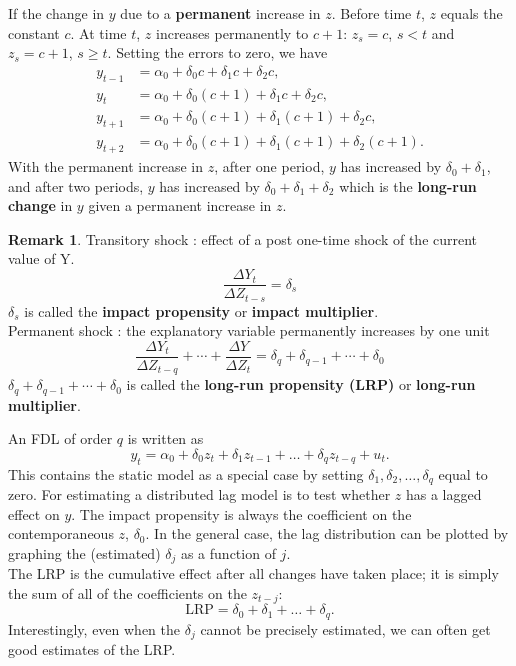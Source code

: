 \documentclass[a4paper, 10pt]{article}
\theoremstyle{definition}	%
\newtheorem*{remark}{Remark}
\begin{document}
If the change in \( y \) due to a \textbf{permanent} increase in \( z \). Before time \( t \), \( z \) equals the constant \( c \). At time \( t \), \( z \) increases permanently to \( c + 1 \): \( z_s = c \), \( s < t \) and \( z_s = c + 1 \), \( s \geq t \). Setting the errors to zero, we have 
\begin{align*}
    y_{t-1} &= \alpha_0 + \delta_0 c + \delta_1 c + \delta_2 c, \\
    y_t &= \alpha_0 + \delta_0 (c + 1) + \delta_1 c + \delta_2 c, \\
    y_{t+1} &= \alpha_0 + \delta_0 (c + 1) + \delta_1 (c + 1) + \delta_2 c, \\
    y_{t+2} &= \alpha_0 + \delta_0 (c + 1) + \delta_1 (c + 1) + \delta_2 (c + 1).
\end{align*}
With the permanent increase in \( z \), after one period, \( y \) has increased by \( \delta_0 + \delta_1 \), and after two periods, \( y \) has increased by \( \delta_0 + \delta_1 + \delta_2 \) which is the \textbf{long-run change} in \( y \) given a permanent increase in \( z \).
\begin{remark} Transitory shock : effect of a post one-time shock of the current value of Y.
\begin{equation*}
    \frac{\Delta Y_t}{\Delta Z_{t-s}} = \delta_s
\end{equation*}
    \( \delta_s\) is called the \textbf{impact propensity} or \textbf{impact multiplier}.\\
Permanent shock : the explanatory variable permanently increases by one unit
    \begin{equation*}
    \frac{\Delta Y_t}{\Delta Z_{t-q}} + \cdots + \frac{\Delta Y}{\Delta Z_{t}} = \delta_q + \delta_{q-1} + \cdots + \delta_0
\end{equation*}
    \( \delta_q + \delta_{q-1} + \cdots + \delta_0 \) is called the\textbf{ long-run propensity (LRP)} or \textbf{long-run multiplier}.
\end{remark}

An FDL of order \( q \) is written as
\begin{equation}
    y_t = \alpha_0 + \delta_0 z_t + \delta_1 z_{t-1} + \dots + \delta_q z_{t-q} + u_t. \label{p.338,10.6}
\end{equation}
This contains the static model as a special case by setting \( \delta_1, \delta_2, \dots, \delta_q \) equal to zero. For estimating a distributed lag model is to test whether \( z \) has a lagged effect on \( y \). The impact propensity is always the coefficient on the contemporaneous \( z \), \( \delta_0 \). In the general case, the lag distribution can be plotted by graphing the (estimated) \( \delta_j \) as a function of \( j \). \\
The LRP is the cumulative effect after all changes have taken place; it is simply the sum of all of the coefficients on the \( z_{t-j} \):
\begin{equation}
    \text{LRP} = \delta_0 + \delta_1 + \dots + \delta_q. \label{p.338,10.7}
\end{equation}
Interestingly, even when the \( \delta_j\) cannot be precisely estimated, we can often get
good estimates of the LRP.
\end{document}
